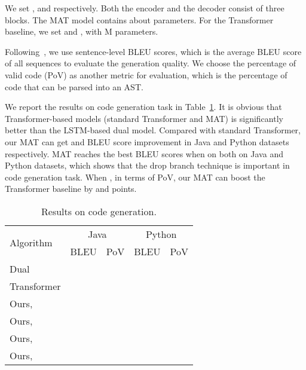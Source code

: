 \documentclass{article}
\begin{document}
 We set ,  and  respectively. Both the encoder  and the decoder consist of three blocks. The MAT model contains about  parameters. For the Transformer baseline, we set  and , with M parameters.

 Following~\cite{wei2019code,ijcai2018-314}, we use sentence-level BLEU scores, which is the average BLEU score of all sequences to evaluate the generation quality. We choose the percentage of valid code (PoV) as another metric for evaluation, which is the percentage of code that can be parsed into an AST.
\iffalse
\noindent{\em Baselines} We compare our results with the following baselines:
\begin{enumerate}
    \item {\textbf{Dual}~\cite{wei2019code}}: This approach proposes a dual training framework between code summarization and code generation to train the two tasks simultaneously. The approach uses two 3-layer LSTM models with the attention mechanism, more than  parameters in total. Compared with Transformer and our method, the dual framework requires extra data and more training cost.
    \item {\textbf{Transformer}~\cite{vaswani2017attention}}: We use the standard Transformer architecture, with , , number of encoder layers and decoder layers set to . The model size is about .
\end{enumerate}
\fi

We report the results on code generation task in Table~\ref{tab:results_codegen}. It is obvious that Transformer-based models (standard Transformer and MAT) is significantly better than the LSTM-based dual model. Compared with standard Transformer, our MAT can get  and  BLEU score improvement in Java and Python datasets respectively. MAT reaches the best BLEU scores when  on both on Java and Python datasets, which shows that the drop branch technique is important in code generation task. When , in terms of PoV, our MAT can boost the Transformer baseline by  and  points. 

\begin{table}[!htbp]
\centering
\caption{Results on code generation.}
\begin{tabular}{lcccc}
\toprule
\multirow{2}{*}{Algorithm} & \multicolumn{2}{c}{Java} & \multicolumn{2}{c}{Python} \\
& BLEU & PoV & BLEU & PoV \\
\hline
Dual~\cite{wei2019code} &  &  &  &  \\
Transformer &  &  &  &  \\
\hline
Ours,  &  &  &  &  \\
Ours,  &  &  &  &  \\
Ours,  &  &  &  &  \\
Ours,  &  &  &  &  \\
\bottomrule
\end{tabular}
\label{tab:results_codegen}
\end{table}
\end{document}
